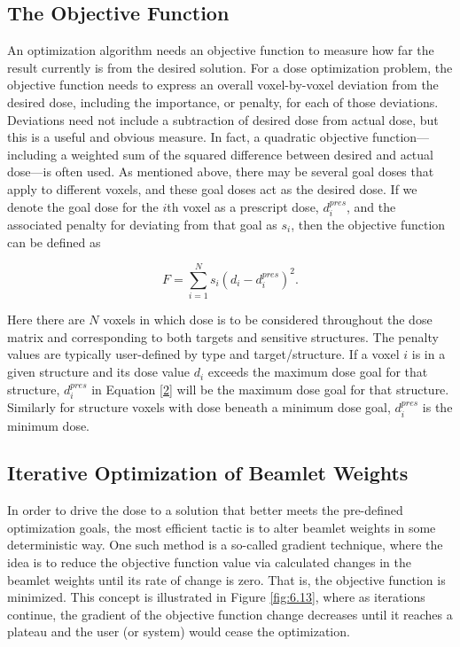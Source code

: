 \subsection*{The Objective Function}

An optimization algorithm needs an objective function to measure how far the result currently is from the desired solution. For a dose optimization problem, the objective function needs to express an overall voxel-by-voxel deviation from the desired dose, including the importance, or penalty, for each of those deviations. Deviations need not include a subtraction of desired dose from actual dose, but this is a useful and obvious measure. In fact, a quadratic objective function---including a weighted sum of the squared difference between desired and actual dose---is often used. As mentioned above, there may be several goal doses that apply to different voxels, and these goal doses act as the desired dose. If we denote the goal dose for the $i$th voxel as a prescript dose, $d_i^{pres}$, and the associated penalty for deviating from that goal as $s_i$, then the objective function can be defined as

\begin{equation}
    F = \sum_{i=1}^{N} s_i \left( d_i - d_i^{pres} \right)^2 .
    \label{2}
\end{equation}

Here there are $N$ voxels in which dose is to be considered throughout the dose matrix and corresponding to both targets and sensitive structures. The penalty values are typically user-defined by type and target/structure. If a voxel $i$ is in a given structure and its dose value $d_i$ exceeds the maximum dose goal for that structure, $d_i^{pres}$ in Equation \ref{2} will be the maximum dose goal for that structure. Similarly for structure voxels with dose beneath a minimum dose goal, $d_i^{pres}$ is the minimum dose.

\subsection*{Iterative Optimization of Beamlet Weights}

In order to drive the dose to a solution that better meets the pre-defined optimization goals, the most efficient tactic is to alter beamlet weights in some deterministic way. One such method is a so-called gradient technique, where the idea is to reduce the objective function value via calculated changes in the beamlet weights until its rate of change is zero. That is, the objective function is minimized. This concept is illustrated in Figure \ref{fig:6.13}, where as iterations continue, the gradient of the objective function change decreases until it reaches a plateau and the user (or system) would cease the optimization.

